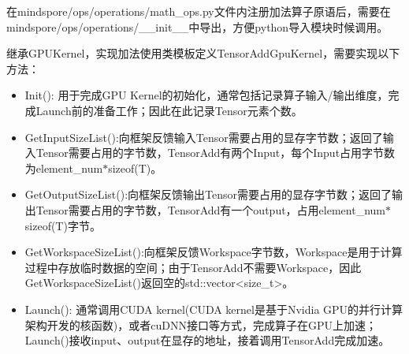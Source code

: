 \documentclass[letterpaper,10pt,english]{sphinxmanual}
\begin{document}
\sphinxAtStartPar
在mindspore/ops/operations/math\_ops.py文件内注册加法算子原语后，需要在mindspore/ops/operations/\_\_init\_\_中导出，方便python导入模块时候调用。

\begin{sphinxVerbatim}[commandchars=\\\{\}]
      
  \PYG{p}{[}
\PYG{p}{]}
\end{sphinxVerbatim}

\sphinxAtStartPar
{}继承GPUKernel，实现加法使用类模板定义TensorAddGpuKernel，需要实现以下方法：
\begin{itemize}
\item {} 
\sphinxAtStartPar
Init(): 用于完成GPU
Kernel的初始化，通常包括记录算子输入/输出维度，完成Launch前的准备工作；因此在此记录Tensor元素个数。

\item {} 
\sphinxAtStartPar
GetInputSizeList():向框架反馈输入Tensor需要占用的显存字节数；返回了输入Tensor需要占用的字节数，TensorAdd有两个Input，每个Input占用字节数为element\_num\(\ast\)sizeof(T)。

\item {} 
\sphinxAtStartPar
GetOutputSizeList():向框架反馈输出Tensor需要占用的显存字节数；返回了输出Tensor需要占用的字节数，TensorAdd有一个output，占用element\_num\(\ast\)sizeof(T)字节。

\item {} 
\sphinxAtStartPar
GetWorkspaceSizeList():向框架反馈Workspace字节数，Workspace是用于计算过程中存放临时数据的空间；由于TensorAdd不需要Workspace，因此GetWorkspaceSizeList()返回空的std::vector<size\_t>。

\item {} 
\sphinxAtStartPar
Launch(): 通常调用CUDA kernel(CUDA kernel是基于Nvidia
GPU的并行计算架构开发的核函数)，或者cuDNN接口等方式，完成算子在GPU上加速；Launch()接收input、output在显存的地址，接着调用TensorAdd完成加速。

\end{itemize}
\end{document}
